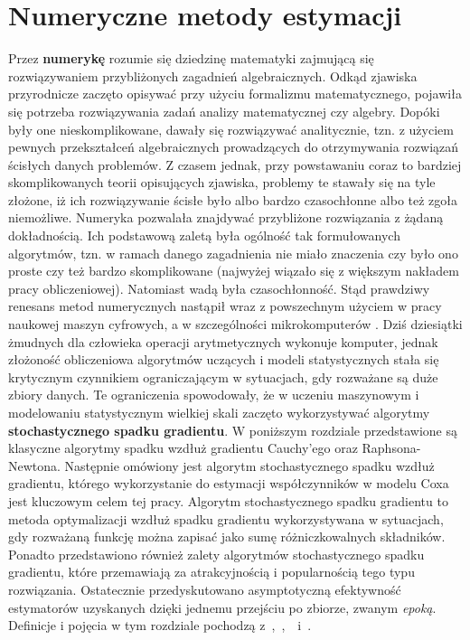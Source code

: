\chapter{Numeryczne metody estymacji}\label{numPAJ}

Przez \textbf{numerykę} rozumie się dziedzinę matematyki
zajmującą się rozwiązywaniem przybliżonych zagadnień algebraicznych. Odkąd zjawiska przyrodnicze zaczęto opisywać przy użyciu formalizmu matematycznego,
pojawiła się potrzeba rozwiązywania zadań analizy matematycznej czy algebry. Dopóki były
one nieskomplikowane, dawały się rozwiązywać analitycznie, tzn. z użyciem pewnych
przekształceń algebraicznych prowadzących do otrzymywania rozwiązań ścisłych danych
problemów. Z czasem jednak, przy powstawaniu coraz to bardziej skomplikowanych teorii
opisujących zjawiska, problemy te stawały się na tyle złożone, iż ich rozwiązywanie ścisłe
było albo bardzo czasochłonne albo też zgoła niemożliwe. Numeryka pozwalała znajdywać
przybliżone rozwiązania z żądaną dokładnością. Ich podstawową zaletą była ogólność tak
formułowanych algorytmów, tzn. w ramach danego zagadnienia nie miało znaczenia czy było
ono proste czy też bardzo skomplikowane (najwyżej wiązało się z większym nakładem pracy
obliczeniowej). Natomiast wadą była czasochłonność. Stąd prawdziwy renesans metod
numerycznych nastąpił wraz z powszechnym użyciem w pracy naukowej maszyn cyfrowych,
a w szczególności mikrokomputerów \cite{milewski}. Dziś dziesiątki żmudnych dla człowieka operacji
arytmetycznych wykonuje komputer, jednak złożoność obliczeniowa algorytmów uczących i modeli statystycznych stała się krytycznym czynnikiem ograniczającym w sytuacjach, gdy rozważane są duże zbiory danych. Te ograniczenia spowodowały, że w uczeniu maszynowym i modelowaniu statystycznym wielkiej skali zaczęto wykorzystywać algorytmy \textbf{stochastycznego spadku gradientu}. W poniższym rozdziale przedstawione są klasyczne algorytmy spadku wzdłuż gradientu Cauchy'ego oraz Raphsona-Newtona. Następnie omówiony jest algorytm stochastycznego spadku wzdłuż gradientu, którego wykorzystanie do estymacji współczynników w modelu Coxa jest kluczowym celem tej pracy. Algorytm stochastycznego spadku gradientu to metoda optymalizacji wzdłuż spadku gradientu wykorzystywana w sytuacjach, gdy rozważaną funkcję można zapisać jako sumę różniczkowalnych składników. Ponadto przedstawiono również zalety algorytmów stochastycznego spadku gradientu, które przemawiają za atrakcyjnością i popularnością tego typu rozwiązania. Ostatecznie przedyskutowano asymptotyczną efektywność estymatorów uzyskanych dzięki jednemu przejściu po zbiorze, zwanym \textit{epoką}. Definicje i pojęcia w tym rozdziale pochodzą z~\cite{bott1},~\cite{bott2},~\cite{kotlowski}~i~\cite{fortuna}.

